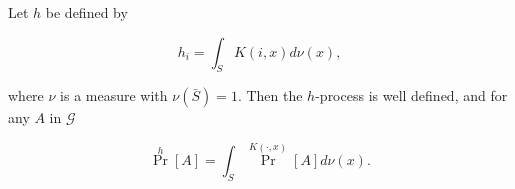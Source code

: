 Let $h$ be defined by

$$h_i = \int_S K(i, x) d\nu(x),$$

where $\nu$ is a measure with $\nu(\bar{S}) = 1$. Then the $h$-process is well defined, and for any $A$ in $\mathcal{G}$

$$\Pr^h[A] = \int_S \Pr^{K(\cdot, x)}[A] d\nu(x).$$
